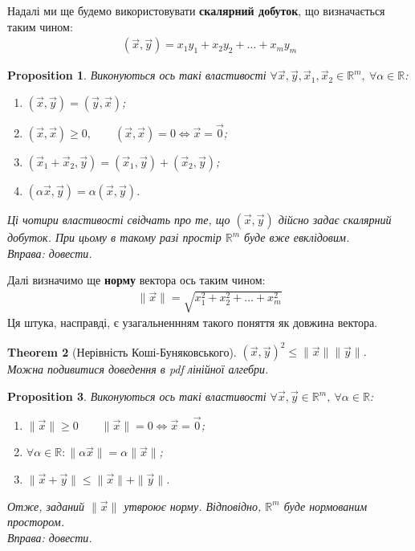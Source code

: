 \documentclass[a4paper, 10pt]{article}
\theoremstyle{theoremdd}
\newtheorem{theorem}{Theorem}[subsection]
\theoremstyle{theoremdd}
\theoremstyle{theoremdd}
\theoremstyle{theoremdd}
\theoremstyle{theoremdd}
\theoremstyle{theoremdd}
\newtheorem{proposition}[theorem]{Proposition}
\theoremstyle{theoremdd}
\theoremstyle{theoremdd}
\theoremstyle{theoremdd}
\begin{document}
Надалі ми ще будемо використовувати \textbf{скалярний добуток}, що визначається таким чином:
\begin{align*}
(\vec{x}, \vec{y}) = x_1 y_1 + x_2 y_2 + \dots + x_m y_m
\end{align*}

\begin{proposition}
Виконуються ось такі властивості $\forall \vec{x},\vec{y},\vec{x}_1,\vec{x}_2 \in \mathbb{R}^m,\ \forall \alpha \in \mathbb{R}$:
\begin{enumerate}[nosep,wide=0pt,label={\arabic*)}]
\item $(\vec{x},\vec{y}) = (\vec{y},\vec{x})$;
\item $(\vec{x},\vec{x}) \geq 0, \qquad (\vec{x},\vec{x}) = 0 \iff \vec{x} = \vec{0}$;
\item $(\vec{x}_1 + \vec{x}_2,\vec{y}) = (\vec{x}_1,\vec{y}) + (\vec{x}_2,\vec{y})$;
\item $(\alpha \vec{x}, \vec{y}) = \alpha (\vec{x}, \vec{y})$. 
\end{enumerate}
Ці чотири властивості свідчать про те, що $(\vec{x},\vec{y})$ дійсно задає скалярний добуток. При цьому в такому разі простір $\mathbb{R}^m$ буде вже евклідовим.\\
\textit{Вправа: довести.}
\end{proposition}

Далі визначимо ще \textbf{норму} вектора ось таким чином:
\begin{align*}
\|\vec{x}\| = \sqrt{x_1^2 + x_2^2 + \dots + x_m^2}
\end{align*}
Ця штука, насправді, є узагальненнням такого поняття як довжина вектора.

\begin{theorem}[Нерівність Коші-Буняковського]
$(\vec{x},\vec{y})^2 \leq \| \vec{x} \| \| \vec{y} \|$.\\
\textit{Можна подивитися доведення в pdf лінійної алгебри.}
\end{theorem}

\begin{proposition}
Виконуються ось такі властивості $\forall \vec{x},\vec{y} \in \mathbb{R}^m,\ \forall \alpha \in \mathbb{R}$:
\begin{enumerate}[nosep,wide=0pt,label={\arabic*)}]
\item $\|\vec{x}\| \geq 0 \qquad \|\vec{x}\| = 0 \iff \vec{x} = \vec{0}$;
\item $\forall \alpha \in \mathbb{R}: \| \alpha \vec{x}\| = \alpha \|\vec{x}\|$;
\item $\| \vec{x} + \vec{y} \| \leq \|\vec{x}\| + \|\vec{y}\|$.
\end{enumerate}
Отже, заданий $\|\vec{x}\|$ утвроює норму. Відповідно, $\mathbb{R}^m$ буде нормованим простором.\\
\textit{Вправа: довести.}
\end{proposition}
\end{document}
